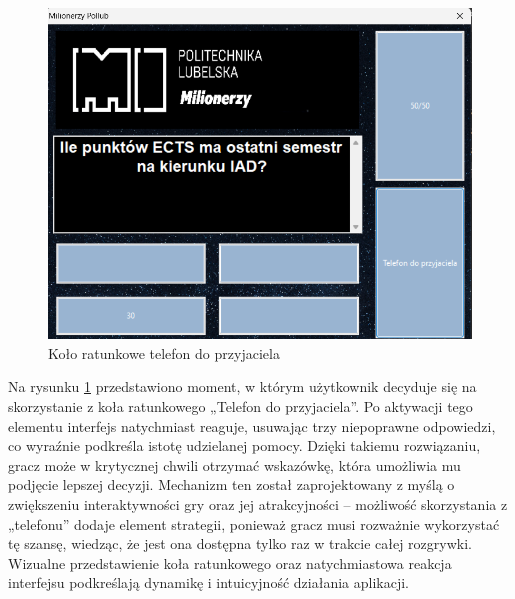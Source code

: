 \documentclass[]{article}
\begin{document}
	\begin{figure}[H]
		\centering
		\includegraphics[scale=0.3]{3.png}
		\caption{Koło ratunkowe telefon do przyjaciela}
		\label{rys:3}
	\end{figure}
	Na rysunku \ref{rys:3} przedstawiono moment, w którym użytkownik decyduje się na skorzystanie z koła ratunkowego „Telefon do przyjaciela”. Po aktywacji tego elementu interfejs natychmiast reaguje, usuwając trzy niepoprawne odpowiedzi, co wyraźnie podkreśla istotę udzielanej pomocy. Dzięki takiemu rozwiązaniu, gracz może w krytycznej chwili otrzymać wskazówkę, która umożliwia mu podjęcie lepszej decyzji. Mechanizm ten został zaprojektowany z myślą o zwiększeniu interaktywności gry oraz jej atrakcyjności – możliwość skorzystania z „telefonu” dodaje element strategii, ponieważ gracz musi rozważnie wykorzystać tę szansę, wiedząc, że jest ona dostępna tylko raz w trakcie całej rozgrywki. Wizualne przedstawienie koła ratunkowego oraz natychmiastowa reakcja interfejsu podkreślają dynamikę i intuicyjność działania aplikacji.
	
\end{document}
